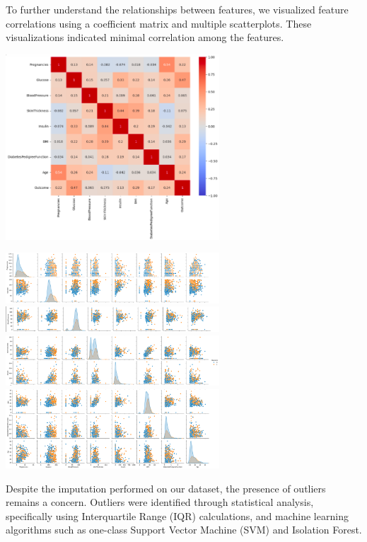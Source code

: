\documentclass[journal]{IEEEtran}
\begin{document}
To further understand the relationships between features, we visualized feature correlations using a coefficient matrix and multiple scatterplots. These visualizations indicated minimal correlation among the features. 
\begin{center}
    \includegraphics[width=8cm]{DATA-CONF.png}
\end{center}
\begin{center}
    \includegraphics[width=8cm]{scatter1.png}
    \includegraphics[width=8cm]{scatter2.png}
    \includegraphics[width=8cm]{scatter3.png}
    \includegraphics[width=8cm]{scatter4.png}
\end{center}

Despite the imputation performed on our dataset, the presence of outliers remains a concern. Outliers were identified through statistical analysis, specifically using Interquartile Range (IQR) calculations, and machine learning algorithms such as one-class Support Vector Machine (SVM) and Isolation Forest.  \\
\end{document}
